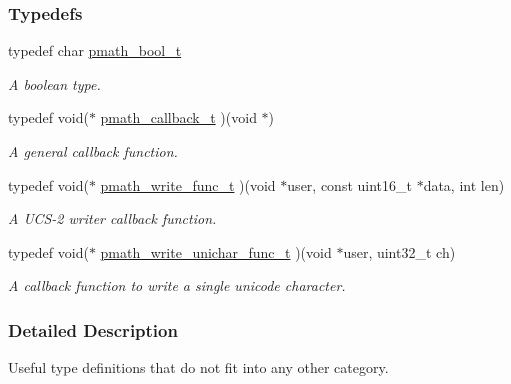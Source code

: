 \subsubsection*{Typedefs}
\begin{CompactItemize}
\item 
typedef char \hyperlink{group__general__types_gc92090cb0b56345d6c379ed2341d4ef4}{pmath\_\-bool\_\-t}
\begin{CompactList}\small\item\em A boolean type. \item\end{CompactList}\item 
typedef void($\ast$ \hyperlink{group__general__types_ge1a454657f18f3cc54508adeccccbcbc}{pmath\_\-callback\_\-t} )(void $\ast$)
\begin{CompactList}\small\item\em A general callback function. \item\end{CompactList}\item 
typedef void($\ast$ \hyperlink{group__general__types_g781a2e0445795bb4e091470fb20497cc}{pmath\_\-write\_\-func\_\-t} )(void $\ast$user, const uint16\_\-t $\ast$data, int len)
\begin{CompactList}\small\item\em A UCS-2 writer callback function. \item\end{CompactList}\item 
\hypertarget{group__general__types_ga04eea54f504dabf2289cf9f62cb6100}{
typedef void($\ast$ \hyperlink{group__general__types_ga04eea54f504dabf2289cf9f62cb6100}{pmath\_\-write\_\-unichar\_\-func\_\-t} )(void $\ast$user, uint32\_\-t ch)}
\label{group__general__types_ga04eea54f504dabf2289cf9f62cb6100}

\begin{CompactList}\small\item\em A callback function to write a single unicode character. \item\end{CompactList}\end{CompactItemize}


\subsubsection{Detailed Description}
Useful type definitions that do not fit into any other category. 

